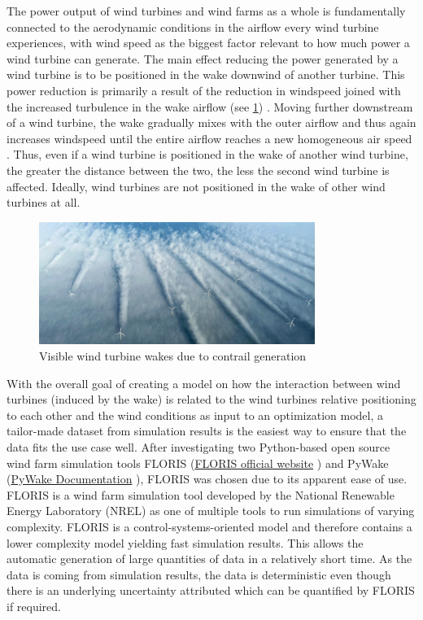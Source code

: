 \documentclass[preprint,12pt]{elsarticle}
\begin{document}
The power output of wind turbines and wind farms as a whole is fundamentally connected to the aerodynamic conditions in the airflow every wind turbine experiences, with wind speed as the biggest factor relevant to how much power a wind turbine can generate. The main effect reducing the power generated by a wind turbine is to be positioned in the wake downwind of another turbine. This power reduction is primarily a result of the reduction in windspeed joined with the increased turbulence in the wake airflow (see \ref{fig:wake_photo})  \cite{KIRANOUDIS1997439}. Moving further downstream of a wind turbine, the wake gradually mixes with the outer airflow and thus again increases windspeed until the entire airflow reaches a new homogeneous air speed \cite{MAGNUSSON1999169}. Thus, even if a wind turbine is positioned in the wake of another wind turbine, the greater the distance between the two, the less the second wind turbine is affected. Ideally, wind turbines are not positioned in the wake of other wind turbines at all. 

\begin{figure}[h] 
	\centering
	\includegraphics[width=0.8\textwidth]{../figures/introduction/wake_photo.png} 
	\caption{Visible wind turbine wakes due to contrail generation \cite{windpowermonthly_offshore_clusters}}
	\label{fig:wake_photo}
\end{figure}


With the overall goal of creating a model on how the interaction between wind turbines (induced by the wake) is related to the wind turbines relative positioning to each other and the wind conditions as input to an optimization model, a tailor-made dataset from simulation results is the easiest way to ensure that the data fits the use case well. After investigating two Python-based open source wind farm simulation tools FLORIS (\href{https://www.nrel.gov/wind/floris}{FLORIS official website} \cite{nrel_floris_web}) and PyWake (\href{https://topfarm.pages.windenergy.dtu.dk/PyWake/}{PyWake Documentation} \cite{dtu_pywake_2025}), FLORIS was chosen due to its apparent ease of use. FLORIS is a wind farm simulation tool developed by the National Renewable Energy Laboratory (NREL) as one of multiple tools to run simulations of varying complexity. FLORIS is a control-systems-oriented model and therefore contains a lower complexity model yielding fast simulation results. This allows the automatic generation of large quantities of data in a relatively short time. As the data is coming from  simulation results, the data is deterministic even though there is an underlying uncertainty attributed which can be quantified by FLORIS if required. 
\end{document}
